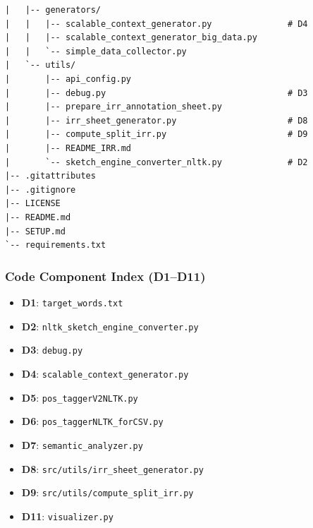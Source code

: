 \documentclass[11pt,a4paper]{article}
\begin{document}
\begin{center}
\begin{minipage}{0.8\textwidth}
\small
\begin{verbatim}
|   |-- generators/
|   |   |-- scalable_context_generator.py               # D4
|   |   |-- scalable_context_generator_big_data.py
|   |   `-- simple_data_collector.py
|   `-- utils/
|       |-- api_config.py
|       |-- debug.py                                    # D3
|       |-- prepare_irr_annotation_sheet.py
|       |-- irr_sheet_generator.py                      # D8
|       |-- compute_split_irr.py                        # D9
|       |-- README_IRR.md
|       `-- sketch_engine_converter_nltk.py             # D2
|-- .gitattributes
|-- .gitignore
|-- LICENSE
|-- README.md
|-- SETUP.md
`-- requirements.txt
\end{verbatim}
\end{minipage}
\label{fig:repo-layout-part2}
\end{center}

\subsubsection*{Code Component Index (D1--D11)}
\begin{itemize}
\item \textbf{D1}: \texttt{target\_words.txt}\label{script:target-words}
\item \textbf{D2}: \texttt{nltk\_sketch\_engine\_converter.py}\label{script:sketch-engine-converter}
\item \textbf{D3}: \texttt{debug.py}\label{script:debug}
\item \textbf{D4}: \texttt{scalable\_context\_generator.py}\label{script:context-generator}
\item \textbf{D5}: \texttt{pos\_taggerV2NLTK.py}\label{script:pos-tagger-v2}
\item \textbf{D6}: \texttt{pos\_taggerNLTK\_forCSV.py}\label{script:pos-tagger-nltk-for-csv}
\item \textbf{D7}: \texttt{semantic\_analyzer.py}\label{script:semantic-analyzer}
\item \textbf{D8}: \texttt{src/utils/irr\_sheet\_generator.py}\label{script:irr-sheet-generator}
\item \textbf{D9}: \texttt{src/utils/compute\_split\_irr.py}\label{script:compute-split-irr}
\item \textbf{D11}: \texttt{visualizer.py}\label{script:visualizer}
\end{itemize}
\end{document}
